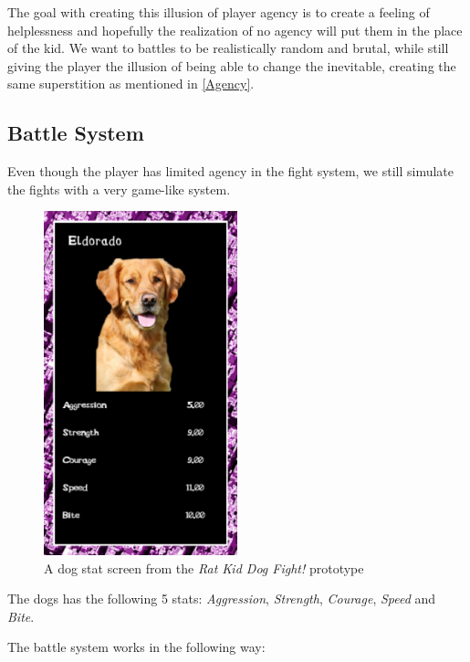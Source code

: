 The goal with creating this illusion of player agency is to create a feeling of helplessness and hopefully the realization of no agency will put them in the place of the kid. 
We want to battles to be realistically random and brutal, while still giving the player the illusion of being able to change the inevitable, creating the same superstition as mentioned in \ref{Agency}.\

\subsection{Battle System}
\label{battleSystem}
Even though the player has limited agency in the fight system, we still simulate the fights with a very game-like system.\

\begin{figure}[h!]
	\centering
    \includegraphics[width=0.5\textwidth]{DogStats.png}
    \caption{A dog stat screen from the \textit{Rat Kid Dog Fight!} prototype}
    \label{fig:DogStatScreen}
\end{figure}


The dogs has the following 5 stats: \textit{Aggression}, \textit{Strength}, \textit{Courage}, \textit{Speed} and \textit{Bite}.\

The battle system works in the following way:

